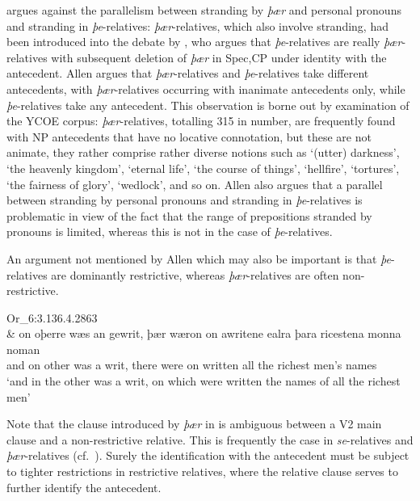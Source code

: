 \documentclass[output=paper]{langsci/langscibook}
\begin{document}
\citet{Allen1980} argues against the parallelism between stranding by
\textit{þær} and personal pronouns and stranding in \textit{þe}-relatives:
\textit{þær}-relatives, which also involve stranding, had been introduced into
the debate by \citet{Vat1978}, who argues that \textit{þe}-relatives are really
\textit{þær}-relatives with subsequent deletion of \textit{þær} in Spec,CP
under identity with the antecedent. Allen argues that \textit{þær}-relatives
and \textit{þe}-relatives take different antecedents, with
\textit{þær}-relatives occurring with inanimate antecedents only, while
\textit{þe}-relatives take any antecedent. This observation is borne out by
examination of the YCOE corpus: \textit{þær}-relatives, totalling 315 in
number, are frequently found with NP antecedents that have no locative
connotation, but these are not animate, they rather comprise rather
diverse notions such as \enquote*{(utter) darkness}, \enquote*{the heavenly
kingdom}, \enquote*{eternal life}, \enquote*{the course of things},
\enquote*{hellfire}, \enquote*{tortures}, \enquote*{the fairness of glory},
\enquote*{wedlock}, and so on. Allen also argues that a parallel between
stranding by personal pronouns and stranding in \textit{þe}-relatives is
problematic in view of the fact that the range of prepositions stranded by
pronouns is limited, whereas this is not in the case of
\textit{þe}-relatives.

An argument not mentioned by Allen which may also be important is that
\textit{þe}-relatives are dominantly restrictive, whereas
\textit{þær}-relatives are often non-re\-stric\-tive.

\ea Or\_6:3.136.4.2863%
    \label{ex:key:11.8}\\
    \gll \& on oþerre wæs an gewrit, þær   wæron on awritene ealra þara ricestena monna noman\\
        and on other   was  a  writ,     there were    on written   all     the    richest men’s  names\\
    \glt ‘and in the other was a writ, on which were written the names of all the richest men’
\z

Note that the clause introduced by \textit{þær} in  is
ambiguous between a V2 main clause and a non-restrictive relative. This is
frequently the case in \textit{se}-relatives and \textit{þær}-relatives (cf.\
\citealt{LosvanKemenade2018}).  Surely the identification with the antecedent
must be subject to tighter restrictions in restrictive relatives, where the
relative clause serves to further identify the antecedent.
\end{document}

